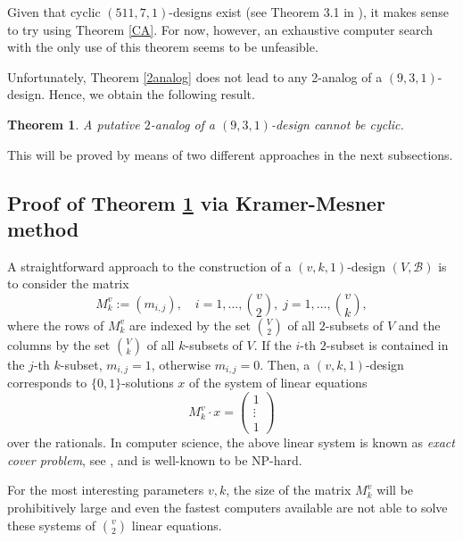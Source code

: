 \documentclass[a4paper, 11pt]{article}
\newtheorem{theorem}{Theorem}[section]
\theoremstyle{definition}
\theoremstyle{definition}
\theoremstyle{definition}
\numberwithin{equation}{section}
\begin{document}
Given that cyclic $(511,7,1)$-designs exist (see Theorem 3.1 in \cite{B2}), it makes sense 
to try using Theorem \ref{CA}. For now, however, an exhaustive computer search with the
only use of this theorem seems to be unfeasible.

Unfortunately, Theorem \ref{2analog} does not lead to 
any 2-analog of a $(9,3,1)$-design. Hence, we obtain the following result.
\begin{theorem}\label{(9,3,1)_2}
A putative $2$-analog of a $(9,3,1)$-design cannot be cyclic.
\end{theorem}
This will be proved by means of two different approaches in the next subsections. 

\subsection{Proof of Theorem \ref{(9,3,1)_2} via Kramer-Mesner method}\label{KM}

A straightforward approach to the construction of a $(v,k,1)$-design $(V,\mathcal{B})$
is to consider the matrix
\[
M_{k}^v := (m_{i,j}),\quad i=1,\ldots,{v\choose 2},\;
j=1,\ldots,{v\choose k},
\]
where the rows of $M_{k}^v$ are indexed by the set $V\choose2$ of all $2$-subsets of $V$ and the columns
by the set $V\choose k$ of all $k$-subsets of $V$. If the $i$-th $2$-subset is
contained in the $j$-th $k$-subset, $m_{i,j}=1$, otherwise $m_{i,j}=0$.
Then, a $(v,k,1)$-design corresponds to $\{0,1\}$-solutions $x$
of the system of linear equations
\[
M_{k}^v \cdot x = \begin{pmatrix}1\\ \vdots \\1\end{pmatrix}
\]
over the rationals.
In computer science, the above linear system %
is known as \emph{exact cover problem}, 
see \cite{knuth:fasc5}, and is well-known to be NP-hard.

For the most interesting parameters
$v,k$, the size of the matrix $M_{k}^v$ will be prohibitively large and 
even the fastest computers available are not able to solve 
these systems of ${v\choose 2}$ linear equations.
\end{document}
